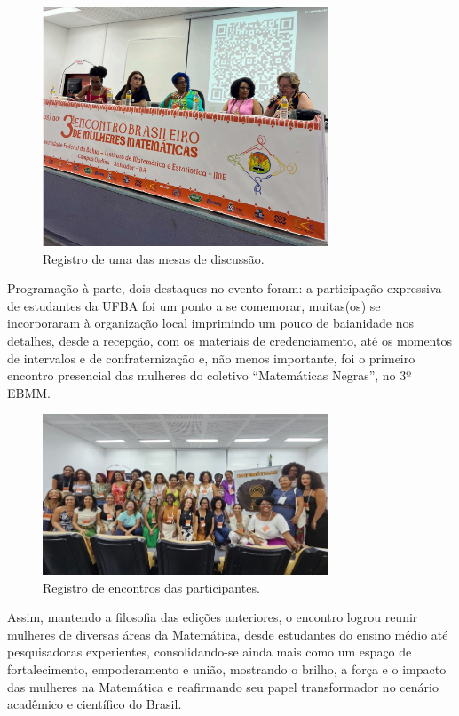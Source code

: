 \documentclass{hipatia}
\begin{document}
\begin{figure}[htb]
    \centering
    \includegraphics[width=8.5cm]{EBMM1.png}
    \caption{Registro de uma das mesas de discussão.}
 \label{EBMM1}
\end{figure}

Programação à parte, dois destaques no evento foram: a participação expressiva de estudantes da UFBA foi um ponto a se comemorar, muitas(os) se incorporaram à organização local imprimindo um pouco de baianidade nos detalhes, desde a recepção, com os materiais de credenciamento, até os momentos de intervalos e de confraternização e, não menos importante, foi o primeiro encontro presencial das mulheres do coletivo ``Matemáticas Negras'', no 3º EBMM.

\begin{figure}[htb]
    \centering
    \includegraphics[width=8.5cm]{EBMM2.jpg}
    \caption{Registro de encontros das participantes.}
 \label{EBMM2}
\end{figure}

Assim, mantendo a filosofia das edições anteriores, o encontro logrou reunir mulheres de diversas áreas da Matemática, desde estudantes do ensino médio até pesquisadoras experientes, consolidando-se ainda mais como um espaço de fortalecimento, empoderamento e união, mostrando o brilho, a força e o impacto das mulheres na Matemática e reafirmando seu papel transformador no cenário acadêmico e científico do Brasil.
\end{document}

